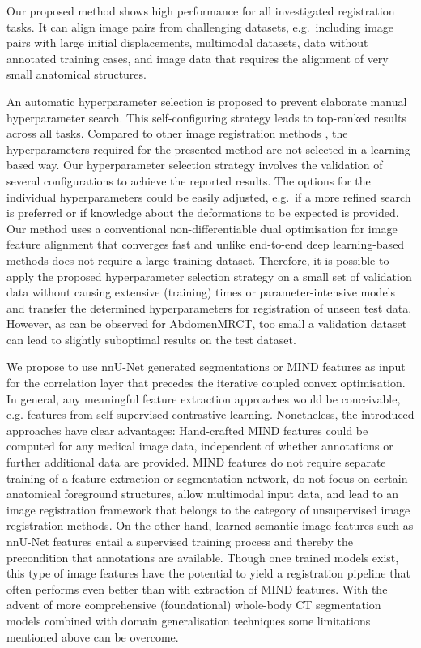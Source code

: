 Our proposed method shows high performance for all investigated registration tasks. It can align image pairs from challenging datasets, e.g.~including image pairs with large initial displacements, multimodal datasets, data without annotated training cases, and image data that requires the alignment of very small anatomical structures.

An automatic hyperparameter selection is proposed to prevent elaborate manual hyperparameter search. This self-configuring strategy leads to top-ranked results across all tasks. Compared to other image registration methods \citep{mok2021conditional,hoopes2021hypermorph}, the hyperparameters required for the presented method are not selected in a learning-based way. Our hyperparameter selection strategy involves the validation of several configurations to achieve the reported results. The options for the individual hyperparameters could be easily adjusted, e.g.~if a more refined search is preferred or if knowledge about the deformations to be expected is provided. Our method uses a conventional non-differentiable dual optimisation for image feature alignment that converges fast and unlike end-to-end deep learning-based methods does not require a large training dataset. Therefore, it is possible to apply the proposed hyperparameter selection strategy on a small set of validation data without causing extensive (training) times or parameter-intensive models and transfer the determined hyperparameters for registration of unseen test data. However, as can be observed for AbdomenMRCT, too small a validation dataset can lead to slightly suboptimal results on the test dataset.%

We propose to use nnU-Net generated segmentations or MIND features as input for the correlation layer that precedes the iterative coupled convex optimisation. In general, any meaningful feature extraction approaches would be conceivable, e.g. features from self-supervised contrastive learning. Nonetheless, the introduced approaches have clear advantages: Hand-crafted MIND features could be computed for any medical image data, independent of whether annotations or further additional data are provided. MIND features do not require separate training of a feature extraction or segmentation network, do not focus on certain anatomical foreground structures, allow multimodal input data, and lead to an image registration framework that belongs to the category of unsupervised image registration methods. On the other hand, learned semantic image features such as nnU-Net features entail a supervised training process and thereby the precondition that annotations are available. Though once trained models exist, this type of image features have the potential to yield a registration pipeline that often performs even better than with extraction of MIND features. With the advent of more comprehensive (foundational) whole-body CT segmentation models \citep{wasserthal2022totalsegmentator}
 combined with domain generalisation techniques \citep{ouyang2022causality} some limitations mentioned above can be overcome.

